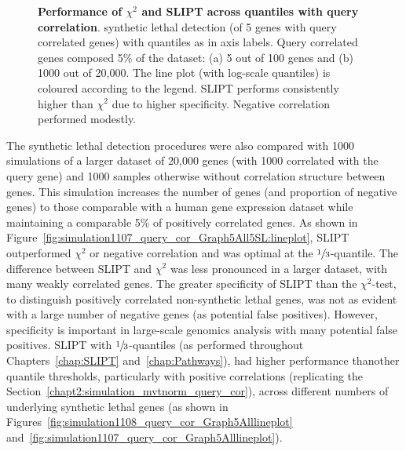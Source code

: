 \begin{figure*}[!tb]
    \caption[Performance of $\chi^2$ and SLIPT across quantiles with query correlation]{\textbf{Performance of $\chi^2$ and SLIPT across quantiles with query correlation}. \Gls{synthetic lethal} detection (of 5 genes  with query correlated genes) with quantiles as in axis labels. Query correlated genes composed 5\% of the dataset: (a) 5 out of 100 genes and (b) 1000 out of 20,000. The line plot (with log-scale quantiles) is coloured according to the legend. \gls{SLIPT} performs consistently higher than $\chi^2$ due to higher specificity. Negative correlation performed modestly.}
    \label{fig:simulation1108_query_cor_Graph5All5SL}
    \end{figure*}
    

The \gls{synthetic lethal} detection procedures were also compared with 1000 simulations of a larger dataset of 20,000 genes (with 1000 correlated with the query gene) and 1000 samples otherwise without correlation structure between genes. This simulation increases the number of genes (and proportion of negative genes) to those comparable with a human \gls{gene expression} dataset while maintaining a comparable 5\% of positively correlated genes. As shown in Figure~\ref{fig:simulation1107_query_cor_Graph5All5SL:lineplot}, \gls{SLIPT} outperformed $\chi^2$ or negative correlation and was optimal at the $\sfrac{1}{3}$-quantile. The difference between \gls{SLIPT} and $\chi^2$ was less pronounced in a larger dataset, with many weakly correlated genes. The greater specificity of \gls{SLIPT} than the $\chi^2$-test, to distinguish positively correlated non-synthetic lethal genes, was not as evident with a large number of negative genes (as potential false positives). However, specificity is important in large-scale \glspl{genomic} analysis with many potential false positives.
%  
\gls{SLIPT} with $\sfrac{1}{3}$-quantiles (as performed throughout Chapters~\ref{chap:SLIPT} and~\ref{chap:Pathways}), had higher performance thanother quantile thresholds, particularly with positive correlations (replicating the Section~\ref{chapt2:simulation_mvtnorm_query_cor}), across different numbers of underlying \gls{synthetic lethal} genes (as shown in Figures~\ref{fig:simulation1108_query_cor_Graph5Alllineplot} and~\ref{fig:simulation1107_query_cor_Graph5Alllineplot}).

